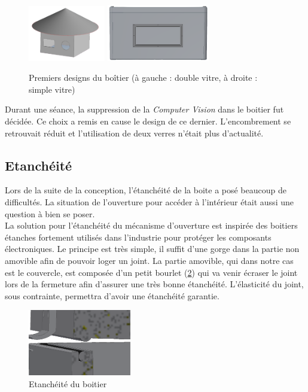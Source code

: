 \begin{figure}[H]
    \centering
    \includegraphics[width=0.3\textwidth]{Images/photos_PGA/Boiterv1.PNG}
    \includegraphics[width=0.4\textwidth]{Images/photos_PGA/boitierv2.PNG}
    \caption{Premiers designs du boîtier (à gauche : double vitre, à droite : simple vitre)}
    \label{fig:boitierv1}
\end{figure}

Durant une séance, la suppression de la \emph{Computer Vision} dans le boitier fut décidée. Ce choix a remis en cause le design 
de ce dernier. L’encombrement se retrouvait réduit et l’utilisation de deux verres n’était plus d'actualité. 

\subsection{Etanchéité}

Lors de la suite de la conception, l’étanchéité de la boite a posé beaucoup de difficultés. La situation 
de l’ouverture pour accéder à l’intérieur était aussi une question à bien se poser. \\
La solution pour l’étanchéité du mécanisme d’ouverture est inspirée des boitiers étanches fortement 
utilisés dans l’industrie pour protéger les composants électroniques. Le principe est très simple, il 
suffit d’une gorge dans la partie non amovible afin de pouvoir loger un joint. La partie amovible, qui 
dans notre cas est le couvercle, est composée d’un petit bourlet (\ref{fig:etanche}) qui va venir écraser le joint lors de 
la fermeture afin d’assurer une très bonne étanchéité. L’élasticité du joint, sous contrainte, permettra 
d’avoir une étanchéité garantie. 

\begin{figure}[H]
    \centering
    \includegraphics[width=0.4\textwidth]{Images/photos_PGA/EtanchBoitier.PNG}
    \caption{Etanchéité du boitier}
    \label{fig:etanche}
\end{figure}

